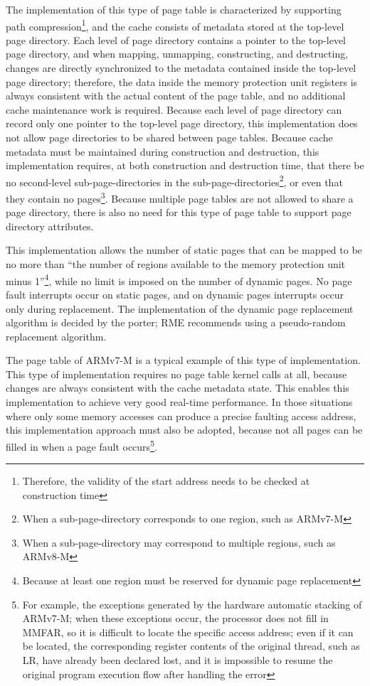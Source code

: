 The implementation of this type of page table is characterized by supporting path compression\footnote{Therefore, the validity of the start address needs to be checked at construction time}, and the cache consists of metadata stored at the top-level page directory. Each level of page directory contains a pointer to the top-level page directory, and when mapping, unmapping, constructing, and destructing, changes are directly synchronized to the metadata contained inside the top-level page directory; therefore, the data inside the memory protection unit registers is always consistent with the actual content of the page table, and no additional cache maintenance work is required. Because each level of page directory can record only one pointer to the top-level page directory, this implementation does not allow page directories to be shared between page tables. Because cache metadata must be maintained during construction and destruction, this implementation requires, at both construction and destruction time, that there be no second-level sub-page-directories in the sub-page-directories\footnote{When a sub-page-directory corresponds to one region, such as ARMv7-M}, or even that they contain no pages\footnote{When a sub-page-directory may correspond to multiple regions, such as ARMv8-M}. Because multiple page tables are not allowed to share a page directory, there is also no need for this type of page table to support page directory attributes.

This implementation allows the number of static pages that can be mapped to be no more than ``the number of regions available to the memory protection unit minus 1''\footnote{Because at least one region must be reserved for dynamic page replacement}, while no limit is imposed on the number of dynamic pages. No page fault interrupts occur on static pages, and on dynamic pages interrupts occur only during replacement. The implementation of the dynamic page replacement algorithm is decided by the porter; RME recommends using a pseudo-random replacement algorithm.

The page table of ARMv7-M is a typical example of this type of implementation. This type of implementation requires no page table kernel calls at all, because changes are always consistent with the cache metadata state. This enables this implementation to achieve very good real-time performance. In those situations where only some memory accesses can produce a precise faulting access address, this implementation approach must also be adopted, because not all pages can be filled in when a page fault occurs\footnote{For example, the exceptions generated by the hardware automatic stacking of ARMv7-M; when these exceptions occur, the processor does not fill in MMFAR, so it is difficult to locate the specific access address; even if it can be located, the corresponding register contents of the original thread, such as LR, have already been declared lost, and it is impossible to resume the original program execution flow after handling the error}.

